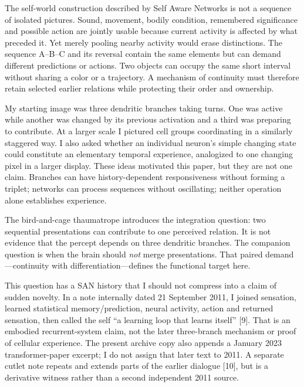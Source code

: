 \documentclass[
  american,
  11pt,
  letterpaper,
]{article}
\begin{document}
The self-world construction described by Self Aware Networks is not a sequence of isolated pictures. Sound, movement, bodily condition, remembered significance and possible action are jointly usable because current activity is affected by what preceded it. Yet merely pooling nearby activity would erase distinctions. The sequence A--B--C and its reversal contain the same elements but can demand different predictions or actions. Two objects can occupy the same short interval without sharing a color or a trajectory. A mechanism of continuity must therefore retain selected earlier relations while protecting their order and ownership.

My starting image was three dendritic branches taking turns. One was active while another was changed by its previous activation and a third was preparing to contribute. At a larger scale I pictured cell groups coordinating in a similarly staggered way. I also asked whether an individual neuron's simple changing state could constitute an elementary temporal experience, analogized to one changing pixel in a larger display. These ideas motivated this paper, but they are not one claim. Branches can have history-dependent responsiveness without forming a triplet; networks can process sequences without oscillating; neither operation alone establishes experience.

The bird-and-cage thaumatrope introduces the integration question: two sequential presentations can contribute to one perceived relation. It is not evidence that the percept depends on three dendritic branches. The companion question is when the brain should \emph{not} merge presentations. That paired demand---continuity with differentiation---defines the functional target here.

This question has a SAN history that I should not compress into a claim of sudden novelty. In a note internally dated 21 September 2011, I joined sensation, learned statistical memory/prediction, neural activity, action and returned sensation, then called the self ``a learning loop that learns itself'' {[}9{]}. That is an embodied recurrent-system claim, not the later three-branch mechanism or proof of cellular experience. The present archive copy also appends a January 2023 transformer-paper excerpt; I do not assign that later text to 2011. A separate cutlet note repeats and extends parts of the earlier dialogue {[}10{]}, but is a derivative witness rather than a second independent 2011 source.
\end{document}
